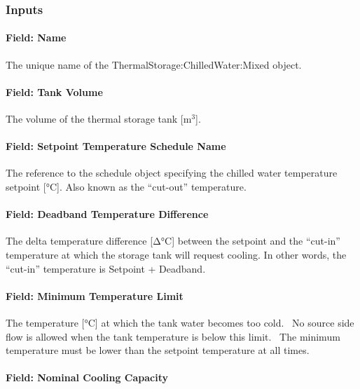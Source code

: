 \subsubsection{Inputs}\label{inputs-22-003}

\paragraph{Field: Name}\label{field-name-22-001}

The unique name of the ThermalStorage:ChilledWater:Mixed object.

\paragraph{Field: Tank Volume}\label{field-tank-volume}

The volume of the thermal storage tank {[}m\(^{3}\){]}.

\paragraph{Field: Setpoint Temperature Schedule Name}\label{field-setpoint-temperature-schedule-name-000}

The reference to the schedule object specifying the chilled water temperature setpoint {[}°C{]}. Also known as the ``cut-out'' temperature.

\paragraph{Field: Deadband Temperature Difference}\label{field-deadband-temperature-difference}

The delta temperature difference {[}Δ°C{]} between the setpoint and the ``cut-in'' temperature at which the storage tank will request cooling. In other words, the ``cut-in'' temperature is Setpoint + Deadband.

\paragraph{Field: Minimum Temperature Limit}\label{field-minimum-temperature-limit}

The temperature {[}°C{]} at which the tank water becomes too cold.~ No source side flow is allowed when the tank temperature is below this limit.~ The minimum temperature must be lower than the setpoint temperature at all times.

\paragraph{Field: Nominal Cooling Capacity}\label{field-nominal-cooling-capacity-2}

